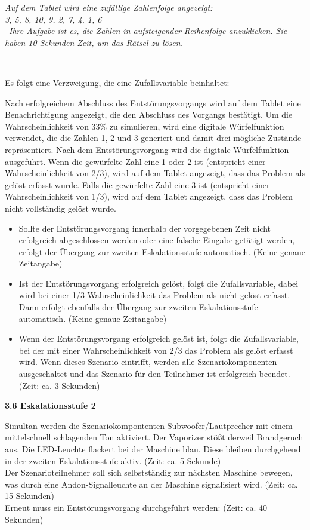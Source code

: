 \emph{Auf dem Tablet wird eine zufällige Zahlenfolge angezeigt:} \\
\emph{3, 5, 8, 10, 9, 2, 7, 4, 1, 6} \\

\
\emph{Ihre Aufgabe ist es, die Zahlen in aufsteigender Reihenfolge anzuklicken. Sie haben 10 Sekunden Zeit, um das Rätsel zu lösen.}

\

Es folgt eine Verzweigung, die eine Zufallsvariable beinhaltet:

{Nach erfolgreichem Abschluss des Entstörungsvorgangs wird auf dem Tablet eine Benachrichtigung angezeigt, die den Abschluss des Vorgangs bestätigt. Um die Wahrscheinlichkeit von 33\% zu simulieren, wird eine digitale Würfelfunktion verwendet, die die Zahlen 1, 2 und 3 generiert und damit drei mögliche Zustände repräsentiert. Nach dem Entstörungsvorgang wird die digitale Würfelfunktion ausgeführt. Wenn die gewürfelte Zahl eine 1 oder 2 ist (entspricht einer Wahrscheinlichkeit von 2/3), wird auf dem Tablet angezeigt, dass das Problem als gelöst erfasst wurde. Falls die gewürfelte Zahl eine 3 ist (entspricht einer Wahrscheinlichkeit von 1/3), wird auf dem Tablet angezeigt, dass das Problem nicht vollständig gelöst wurde. \\

\begin{itemize}
\item
Sollte der Entstörungsvorgang innerhalb der vorgegebenen Zeit nicht erfolgreich abgeschlossen werden oder eine falsche Eingabe getätigt werden, erfolgt der Übergang zur zweiten Eskalationsstufe automatisch. (Keine genaue Zeitangabe)
\item
Ist der Entstörungsvorgang erfolgreich gelöst, folgt die Zufallsvariable, dabei wird bei einer 1/3 Wahrscheinlichkeit das Problem als nicht gelöst erfasst. Dann erfolgt ebenfalls der Übergang zur zweiten Eskalationsstufe automatisch. (Keine genaue Zeitangabe)
\item
Wenn der Entstörungsvorgang erfolgreich gelöst ist, folgt die Zufallsvariable, bei der mit einer Wahrscheinlichkeit von 2/3 das Problem als gelöst erfasst wird. Wenn dieses Szenario eintrifft, werden alle Szenariokomponenten ausgeschaltet und das Szenario für den Teilnehmer ist erfolgreich beendet.  (Zeit: ca. 3 Sekunden)
\end{itemize}


\newpage 

\textbf{3.6 Eskalationsstufe 2}

Simultan werden die Szenariokompontenten Subwoofer/Lautprecher mit einem mittelschnell schlagenden Ton aktiviert. Der Vaporizer stößt derweil Brandgeruch aus. Die LED-Leuchte flackert bei der Maschine blau. Diese bleiben durchgehend in der zweiten Eskalationsstufe aktiv. (Zeit: ca. 5 Sekunde) \\
Der Szenarioteilnehmer soll sich selbstständig zur nächsten Maschine bewegen, was durch eine Andon-Signalleuchte an der Maschine signalisiert wird. (Zeit: ca. 15 Sekunden) \\
Erneut muss ein Entstörungsvorgang durchgeführt werden: (Zeit: ca. 40 Sekunden) 

}
